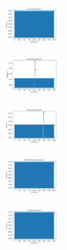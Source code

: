 \vspace*{\fill}
\newpage
\vspace*{\fill}

\begin{figure}[H]    
    \centering
    \begin{subfigure}
        \centering
        \includegraphics[width=0.234\textwidth]{img/ageun/iris_set_const_20_949004259_time.png}
    \end{subfigure}
    \hfill
    \begin{subfigure}
        \centering
        \includegraphics[width=0.234\textwidth]{img/ageun/ecoli_set_const_20_949004259_time.png}
    \end{subfigure}
    \hfill
    \begin{subfigure}
        \centering
        \includegraphics[width=0.234\textwidth]{img/ageun/rand_set_const_20_949004259_time.png}
    \end{subfigure}
    \hfill
    \begin{subfigure}
        \centering
        \includegraphics[width=0.234\textwidth]{img/ageun/newthyroid_set_const_20_949004259_time.png}
    \end{subfigure}
    \hfill
    \begin{subfigure}
        \centering
        \includegraphics[width=0.234\textwidth]{img/ageun/iris_set_const_20_589741062_time.png}

\end{subfigure}
\end{figure}

